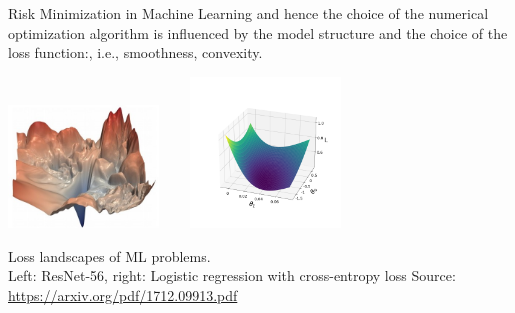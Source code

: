\begin{vbframe}{Risk Minimization in Machine Learning}
and hence the choice of the numerical optimization algorithm is influenced by the model structure and the choice of the loss function:, i.e., smoothness, convexity. 		
\vspace*{-0.5cm}
\begin{center}
		\includegraphics[width=0.3\textwidth]{figure_man/ml_landscape.jpg} ~~~ \includegraphics[width=0.3\textwidth]{figure_man/log_reg.png}
	\begin{footnotesize}
		\newline
		Loss landscapes of ML problems. \\ Left: ResNet-56, right: Logistic regression with cross-entropy loss
		\newline
		Source: \url{https://arxiv.org/pdf/1712.09913.pdf}
	\end{footnotesize}
\end{center}	

\end{vbframe}




\endlecture

